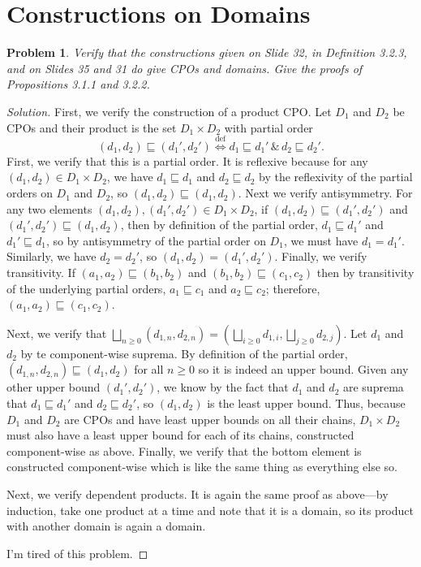 \documentclass{article}
\newtheorem{problem}{Problem}[section]}
\begin{document}
\section{Constructions on Domains}
\begin{problem}
    Verify that the constructions given on Slide 32, in Definition 3.2.3, and on
    Slides 35 and 31 do give CPOs and domains. Give the proofs of Propositions
    3.1.1 and 3.2.2.
\end{problem}
\begin{proof}[Solution]
    First, we verify the construction of a product CPO. Let $D_1$ and $D_2$ be
    CPOs and their product is the set $D_1\times D_2$ with partial order 
    \[
        (d_1,d_2)\sqsubseteq(d_1',d_2')
        \stackrel{\text{def}}{\Leftrightarrow}d_1\sqsubseteq d_1' \,\&\,
        d_2\sqsubseteq d_2'.
    \]
    First, we verify that this is a partial order. It is reflexive because for
    any $(d_1,d_2)\in D_1\times D_2$, we have $d_1\sqsubseteq d_1$ and
    $d_2\sqsubseteq d_2$ by the reflexivity of the partial orders on $D_1$ and
    $D_2$, so $(d_1,d_2)\sqsubseteq(d_1,d_2)$. Next we verify antisymmetry. For
    any two elements $(d_1,d_2),(d_1',d_2')\in D_1\times D_2$, if
    $(d_1,d_2)\sqsubseteq (d_1',d_2')$ and $(d_1',d_2')\sqsubseteq (d_1,d_2)$,
    then by definition of the partial order, $d_1\sqsubseteq d_1'$ and
    $d_1'\sqsubseteq d_1$, so by antisymmetry of the partial order on $D_1$, we
    must have $d_1=d_1'$. Similarly, we have $d_2=d_2'$, so
    $(d_1,d_2)=(d_1',d_2')$. Finally, we verify transitivity. If
    $(a_1,a_2)\sqsubseteq (b_1,b_2)$ and $(b_1,b_2)\sqsubseteq (c_1,c_2)$ then
    by transitivity of the underlying partial orders, $a_1\sqsubseteq c_1$ and
    $a_2\sqsubseteq c_2$; therefore, $(a_1,a_2)\sqsubseteq (c_1,c_2)$.

    Next, we verify that $\bigsqcup_{n\geq 0}(d_{1,n},d_{2,n})
    = \left(\bigsqcup_{i\geq 0}d_{1,i}, \bigsqcup_{j\geq 0}d_{2,j}\right)$. Let
    $d_1$ and $d_2$ by te component-wise suprema. By definition of the partial
    order, $(d_{1,n},d_{2,n})\sqsubseteq (d_1,d_2)$ for all $n\geq 0$ so it is
    indeed an upper bound. Given any other upper bound $(d_1',d_2')$, we know by
    the fact that $d_1$ and $d_2$ are suprema that $d_1\sqsubseteq d_1'$ and
    $d_2\sqsubseteq d_2'$, so $(d_1,d_2)$ is the least upper bound. Thus,
    because $D_1$ and $D_2$ are CPOs and have least upper bounds on all their
    chains, $D_1\times D_2$ must also have a least upper bound for each of its
    chains, constructed component-wise as above. Finally, we verify that the
    bottom element is constructed component-wise which is like the same thing as
    everything else so.

    Next, we verify dependent products. It is again the same proof as above---by
    induction, take one product at a time and note that it is a domain, so its
    product with another domain is again a domain.

    I'm tired of this problem.
\end{proof}
\end{document}
